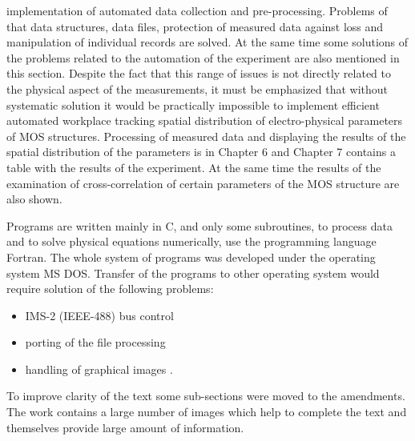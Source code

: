 implementation of automated data collection and
pre-processing. Problems of that data structures, data files,
protection of measured data against loss and manipulation of
individual records are solved.  At the same time some solutions of the
problems related to the automation of the experiment are also
mentioned in this section. Despite the fact that this range of issues
is not directly related to the physical aspect of the measurements, it
must be emphasized that without systematic solution it would be
practically impossible to implement efficient automated workplace
tracking spatial distribution of electro-physical parameters of MOS
structures. Processing of measured data and displaying the results of
the spatial distribution of the parameters is in Chapter 6 and Chapter
7 contains a table with the results of the experiment. At the same
time the results of the examination of cross-correlation of certain
parameters of the MOS structure are also shown.

\iffalse
\par Použité programy sú väčšinou napísané v jazyku C a iba niektoré
podprogramy spracovania dat a numerického riešenia fyzikálnych rovnic
používajú programovací jazyk Fortran. Celý systém programov bol
realizovaný pod operačným systémom MS DOS. Prenos programov pod iný
operačný systém by vyžadoval vyriešenie následovných okruhov
problémov:
\begin{itemize}
\item{riadenie zbernice IMS-2}
\item{prisppsôbenie sa systému práce so súbormi}
\item{grafické zobrazenie údajov} .
\end{itemize}
\fi
\par Programs are written mainly in C, and only some subroutines, to
process data and to solve physical equations numerically, use the
programming language Fortran. The whole system of programs was
developed under the operating system MS DOS. Transfer of the programs
to other operating system would require solution of the following
problems:
\begin{itemize}
\item{IMS-2 (IEEE-488) bus control}
\item{porting of the file processing}
\item{handling of graphical images} .
\end{itemize}

\iffalse \par Pre väčšiu prehľadnosť textu boli niektoré jej dielčie
časti presunuté do dodatkov.  Práca obsahuje značný počet obrázkov,
ktoré pomáhajú doplniť text a samy o sebe poskytujú množstvo
informácií.
\fi
\par To improve clarity of the text some sub-sections were moved to
the amendments. The work contains a large number of images which help
to complete the text and themselves provide large amount of
information.

